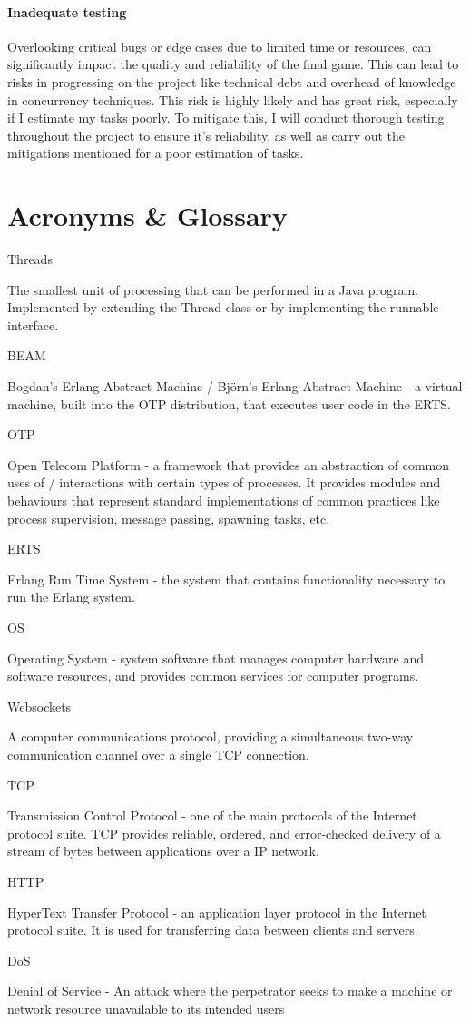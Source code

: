 \documentclass[]{project_plan}
\begin{document}
\subsubsection{Inadequate testing}
Overlooking critical bugs or edge cases due to limited time or resources, can significantly impact the quality
and reliability of the final game. This can lead to risks in progressing on the project like technical debt
and overhead of knowledge in concurrency techniques. This risk is highly likely and has great risk, especially
if I estimate my tasks poorly. To mitigate this, I will conduct thorough testing throughout
the project to ensure it's reliability, as well as carry out the mitigations mentioned for a poor estimation
of tasks.


\chapter{Acronyms \& Glossary}

Threads

The smallest unit of processing that can be performed in a Java program. Implemented by extending the
Thread class or by implementing the runnable interface.

BEAM

Bogdan's Erlang Abstract Machine / Björn's Erlang Abstract Machine - a virtual machine, built into the OTP
distribution, that executes user code in the ERTS.

OTP

Open Telecom Platform - a framework that provides an abstraction of common uses of / interactions with
certain types of processes. It provides modules and behaviours that represent standard implementations of
common practices like process supervision, message passing, spawning tasks, etc.

ERTS

Erlang Run Time System - the system that contains functionality necessary to run the Erlang system.

OS

Operating System - system software that manages computer hardware and software resources, and
provides common services for computer programs.

Websockets

A computer communications protocol, providing a simultaneous two-way communication channel
over a single TCP connection.

TCP

Transmission Control Protocol - one of the main protocols of the Internet protocol suite. TCP provides
reliable, ordered, and error-checked delivery of a stream of bytes between applications over a IP network.

HTTP

HyperText Transfer Protocol - an application layer protocol in the Internet protocol suite.
It is used for transferring data between clients and servers.

DoS

Denial of Service - An attack where the perpetrator seeks to make a machine or network resource unavailable
to its intended users




\end{document}
